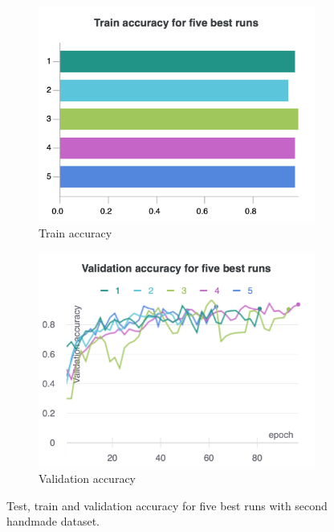\begin{figure}[hbtp]
\begin{subfigure}{0.31\textwidth}
			\includegraphics[width=\linewidth]{fig/results/wandb/second_handmade_sweep/charts/Section-2-Panel-1-mvdok5l4p.png}
			\caption{Train accuracy}
		\end{subfigure}
		\hspace*{\fill}   %
		\begin{subfigure}{0.31\textwidth}
			\centering
			\includegraphics[width=\linewidth]{fig/results/wandb/second_handmade_sweep/charts/Section-2-Panel-2-p9dhpnuq6.png}
			\caption{Validation accuracy}
		\end{subfigure}
		\caption{Test, train and validation accuracy for five best runs with second handmade dataset.}
		\label{fig:results:shm:overall}
	\end{figure}

